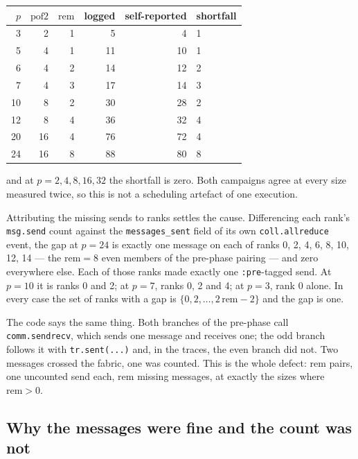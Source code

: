 \documentclass[11pt]{article}
\begin{document}
\begin{center}\footnotesize
\begin{tabular}{@{}rrrrrl@{}}
\toprule
  $p$ & $\mathrm{pof2}$ & $\mathrm{rem}$ & logged & self-reported & shortfall \\
\midrule
  3  & 2  & 1 & 5  & 4  & 1 \\
  5  & 4  & 1 & 11 & 10 & 1 \\
  6  & 4  & 2 & 14 & 12 & 2 \\
  7  & 4  & 3 & 17 & 14 & 3 \\
  10 & 8  & 2 & 30 & 28 & 2 \\
  12 & 8  & 4 & 36 & 32 & 4 \\
  20 & 16 & 4 & 76 & 72 & 4 \\
  24 & 16 & 8 & 88 & 80 & 8 \\
\bottomrule
\end{tabular}\normalsize
\end{center}

\noindent
and at $p = 2, 4, 8, 16, 32$ the shortfall is zero. Both campaigns agree at every size measured
twice, so this is not a scheduling artefact of one execution.

Attributing the missing sends to ranks settles the cause. Differencing each rank's
\texttt{msg.send} count against the \texttt{messages\_sent} field of its own
\texttt{coll.allreduce} event, the gap at $p=24$ is exactly one message on each of ranks
0, 2, 4, 6, 8, 10, 12, 14 --- the $\mathrm{rem}=8$ even members of the pre-phase pairing --- and
zero everywhere else. Each of those ranks made exactly one \texttt{:pre}-tagged send. At $p=10$
it is ranks 0 and 2; at $p=7$, ranks 0, 2 and 4; at $p=3$, rank 0 alone. In every case the set of
ranks with a gap is $\{0, 2, \ldots, 2\,\mathrm{rem}-2\}$ and the gap is one.

The code says the same thing. Both branches of the pre-phase call \texttt{comm.sendrecv}, which
sends one message and receives one; the odd branch follows it with \texttt{tr.sent(...)} and, in
the traces, the even branch did not. Two messages crossed the fabric, one was counted. This is
the whole defect: $\mathrm{rem}$ pairs, one uncounted send each, $\mathrm{rem}$ missing messages,
at exactly the sizes where $\mathrm{rem} > 0$.

\subsection{Why the messages were fine and the count was not}
\end{document}
